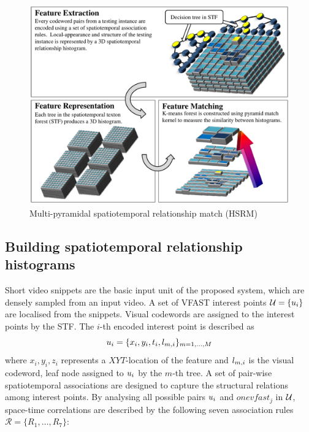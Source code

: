\begin{figure}[ht]
	\centering	
	\includegraphics[width=0.8\linewidth]{fig/act/fig4_new.pdf} 
	\caption{Multi-pyramidal spatiotemporal relationship match (HSRM)}
	\label{fig/act/hsrm}
\end{figure}

\subsection{Building spatiotemporal relationship histograms}

Short video snippets are the basic input unit of the proposed system, which are densely sampled from an input video.  
A set of VFAST interest points $\mathcal{U} = \{u_{i}\}$ are localised from the snippets. Visual codewords are assigned to the interest points by the STF.   
The $i$-th encoded interest point is described as 
\begin{equation}
	u_{i} = \{x_i, y_i, t_i, l_{m,i}\}_{m=1,\dots,M}
\end{equation}
where $x_i, y_i, z_i$ represents a $XYT$-location of the feature and $l_{m,i}$ is the visual codeword, \ie leaf node assigned to $u_{i}$ by the $m$-th tree. 
A set of pair-wise spatiotemporal associations are designed to capture the structural relations among interest points. By analysing all possible pairs $u_i$ and $onevfast_j$ in $\mathcal{U}$, space-time correlations are described by the following seven association rules $\mathcal{R} = \{ R_1,\dots,R_7\}$:

